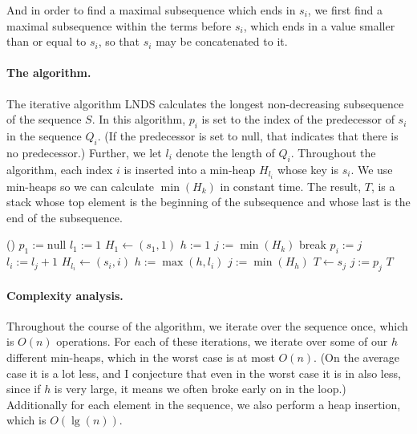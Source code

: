 \documentclass{article}
\begin{document}
And in order to find a maximal subsequence which ends in \(s_i\), we first find a maximal subsequence within the terms before \(s_i\), which ends in a value smaller than or equal to \(s_i\), so that \(s_i\) may be concatenated to it.

\paragraph{The algorithm.} The iterative algorithm \textsc{LNDS} calculates the longest non-decreasing subsequence of the sequence \(S\). In this algorithm, \(p_i\) is set to the index of the predecessor of \(s_i\) in the sequence \(Q_i\). (If the predecessor is set to null, that indicates that there is no predecessor.) Further, we let \(l_i\) denote the length of \(Q_i\). Throughout the algorithm, each index \(i\) is inserted into a min-heap \(H_{l_i}\) whose key is \(s_i\). We use min-heaps so we can calculate \(\min(H_k)\) in constant time. The result, \(T\), is a stack whose top element is the beginning of the subsequence and whose last is the end of the subsequence.

\begin{algorithm}
	\begin{algorithmic}
		\Return ()
		\EndIf
		\State \(p_1 := \text{null}\) 
		\State \(l_1 := 1\) 
		\State \(H_1 \leftarrow (s_1, 1)\) 
		\State \(h := 1\) 
		\State \(j := \min(H_k)\) 
		 break 
		\EndIf
		\EndFor
		\State \(p_i := j\)
		\State \(l_i := l_j + 1\)
		\State \(H_{l_i} \leftarrow (s_i, i)\)
		\State \(h := \max(h, l_i)\) 
		\EndFor
		\State \(j := \min(H_h)\) 
		\State \(T \leftarrow s_j\)
		\State \(j := p_j\)
		\EndWhile
		\State \Return \(T\)
		\EndFunction
	\end{algorithmic}
\end{algorithm}

\paragraph{Complexity analysis.} Throughout the course of the algorithm, we iterate over the sequence once, which is \(O(n)\) operations. For each of these iterations, we iterate over some of our \(h\) different min-heaps, which in the worst case is at most \(O(n)\). (On the average case it is a lot less, and I conjecture that even in the worst case it is in also less, since if \(h\) is very large, it means we often broke early on in the loop.) Additionally for each element in the sequence, we also perform a heap insertion, which is \(O(\lg(n))\).
\end{document}
